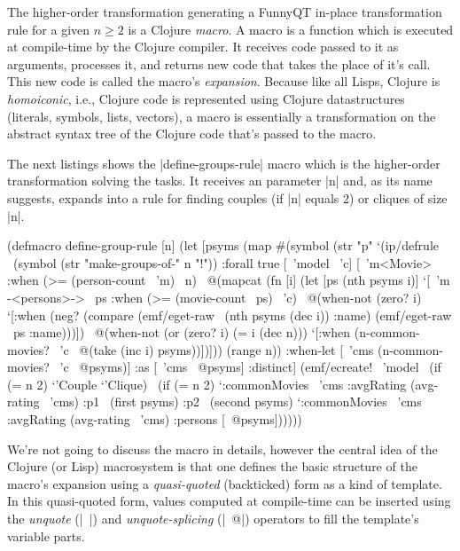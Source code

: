 \documentclass[submission]{eptcs}
\newcommand{\code}{\clojureinline}
\begin{document}
The higher-order transformation generating a FunnyQT in-place transformation
rule for a given \(n \geq 2\)
is a Clojure \emph{macro}.  A macro is a function which is executed at
compile-time by the Clojure compiler.  It receives code passed to it as
arguments, processes it, and returns new code that takes the place of it's
call.  This new code is called the macro's \emph{expansion}.  Because like all
Lisps, Clojure is \emph{homoiconic}, i.e., Clojure code is represented using
Clojure datastructures (literals, symbols, lists, vectors), a macro is
essentially a transformation on the abstract syntax tree of the Clojure code
that's passed to the macro.

The next listings shows the \code|define-groups-rule| macro which is the
higher-order transformation solving the tasks.  It receives an parameter
\code|n| and, as its name suggests, expands into a rule for finding couples (if
\code|n| equals 2) or cliques of size \code|n|.

\begin{clojurecode}
(defmacro define-group-rule [n]
  (let [psyms (map #(symbol (str "p" %
    `(ip/defrule ~(symbol (str "make-groups-of-" n "!"))
       {:forall true}
       [~'model ~'c]
       [~'m<Movie> :when (>= (person-count ~'m) ~n)
        ~@(mapcat (fn [i]
                    (let [ps (nth psyms i)]
                      `[~'m -<persons>-> ~ps
                        :when (>= (movie-count ~ps) ~'c)
                        ~@(when-not (zero? i)
                            `[:when (neg? (compare (emf/eget-raw ~(nth psyms (dec i)) :name)
                                                   (emf/eget-raw ~ps :name)))])
                        ~@(when-not (or (zero? i) (= i (dec n)))
                            `[:when (n-common-movies? ~'c ~@(take (inc i) psyms))])]))
                  (range n))
        :when-let [~'cms (n-common-movies? ~'c ~@psyms)]
        :as [~'cms ~@psyms]
        :distinct]
       (emf/ecreate! ~'model ~(if (= n 2) `'Couple `'Clique)
                     ~(if (= n 2)
                        `{:commonMovies ~'cms :avgRating (avg-rating ~'cms)
                          :p1 ~(first psyms) :p2 ~(second psyms)}
                        `{:commonMovies ~'cms :avgRating (avg-rating ~'cms)
                          :persons [~@psyms]})))))
\end{clojurecode}

We're not going to discuss the macro in details, however the central idea of
the Clojure (or Lisp) macrosystem is that one defines the basic structure of
the macro's expansion using a \emph{quasi-quoted} (backticked) form as a kind
of template.  In this quasi-quoted form, values computed at compile-time can be
inserted using the \emph{unquote} (\code|~|) and \emph{unquote-splicing}
(\code|~@|) operators to fill the template's variable parts.
\end{document}
